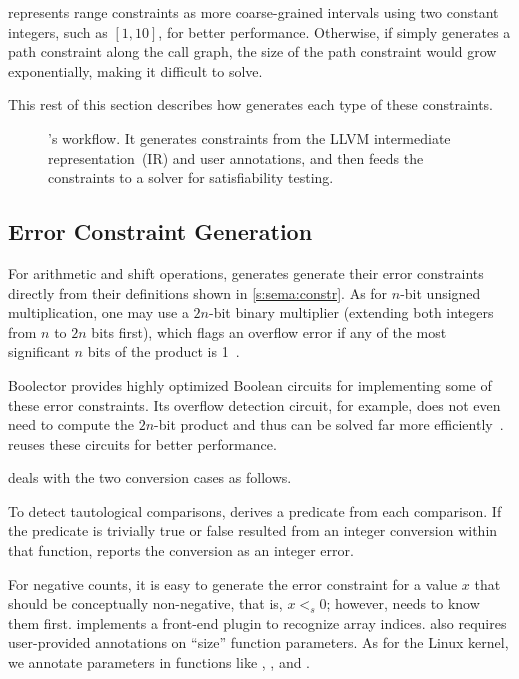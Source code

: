 \sys represents range constraints as more coarse-grained intervals
using two constant integers, such as $[1, 10]$, for better performance.
Otherwise, if \sys simply generates a path constraint along the
call graph, the size of the path constraint would grow exponentially,
making it difficult to solve.

\paraend

This rest of this section describes how \sys generates each type
of these constraints.

\begin{figure}
\centering
\resizebox{\linewidth}{!}{

}
\caption{\sys's workflow.  It generates constraints from the LLVM
intermediate representation~(IR) and user annotations, and then feeds
the constraints to a solver for satisfiability testing.}
\label{f:flow}
\end{figure}

\subsection{Error Constraint Generation}
\label{s:gen:err}

For arithmetic and shift operations, \sys generates
generate their error constraints directly from their definitions shown in
\autoref{s:sema:constr}.  As for $n$-bit unsigned multiplication,
one may use a $2n$-bit binary multiplier (extending both integers
from $n$ to $2n$ bits first), which flags an overflow error if any
of the most significant $n$ bits of the product is
1~\cite{molnar:catchconv}.

Boolector provides highly optimized Boolean circuits for implementing
some of these error constraints.  Its overflow detection circuit,
for example, does not even need to compute the $2n$-bit product and
thus can be solved far more
efficiently~\cite[\chapterautorefname~3.5]{brummayer:phd}.  \sys
reuses these circuits for better performance.

\sys deals with the two conversion cases as follows.

To detect tautological comparisons, \sys derives a predicate from
each comparison.  If the predicate is trivially true or false
resulted from an integer conversion within that function, \sys
reports the conversion as an integer error.

For negative counts, it is easy to generate the error constraint
for a value $x$ that should be conceptually non-negative, that is,
$x <_s 0$; however, \sys needs to know them first.  \sys implements
a front-end plugin to recognize array indices.  \sys also requires
user-provided annotations on ``size'' function parameters.  As for
the Linux kernel, we annotate parameters in functions like ,
, and .


